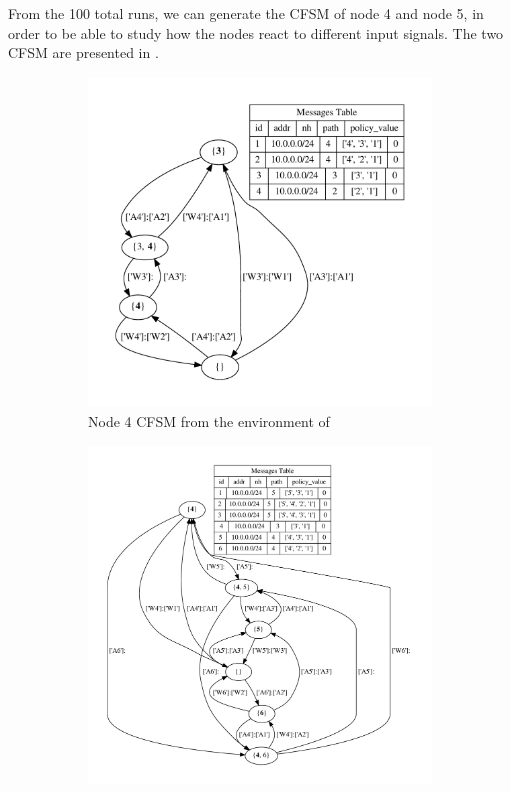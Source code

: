 From the \num{100} total runs, we can generate the \ac{CFSM} of node \num{4} and
node \num{5}, in order to be able to study how the nodes react to different
input signals.
The two \ac{CFSM} are presented in .

\begin{figure}[h]
     \centering
     \begin{subfigure}[b]{0.45\textwidth}
         \centering
         \includegraphics[width=\textwidth]{images/fsm/fig_4_4.pdf}
		 \caption{Node \num{4} \ac{CFSM} from the environment of }
         \label{fig:fsm_node4}
     \end{subfigure}
     \hfill
     \begin{subfigure}[b]{0.45\textwidth}
         \centering
         \includegraphics[width=\textwidth]{images/fsm/fig_4_5.pdf}

\end{subfigure}
\end{figure}
